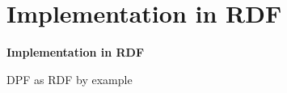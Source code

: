 \documentclass[dvips,slidetop,mathserif,brown]{beamer}
\begin{document}
\section{Implementation in RDF}

\begin{frame}{}
  \begin{center}
    \begin{Huge}
      \textbf{Implementation in RDF}
    \end{Huge}
  \end{center}
\end{frame}

\begin{frame}[t]{DPF as RDF by example}

\begin{columns}[T]



\end{columns}
\end{frame}
\end{document}
